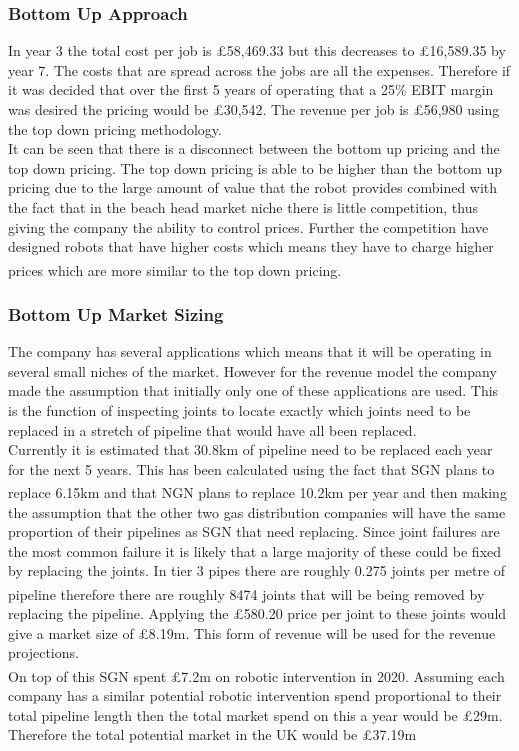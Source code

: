 \documentclass[11pt]{article}		%
\newcommand{\supercite}[1]{\textsuperscript{\cite{#1}}}		%
\begin{document}
            \subsubsection{Bottom Up Approach}

	            In year 3 the total cost per job is £58,469.33 but this decreases to £16,589.35 by year 7. The costs that are spread across the jobs are all the expenses. Therefore if it was decided that over the first 5 years of operating that a 25\% EBIT margin was desired the pricing would be £30,542. The revenue per job is £56,980 using the top down pricing methodology.
	            \\
	            It can be seen that there is a disconnect between the bottom up pricing and the top down pricing. The top down pricing is able to be higher than the bottom up pricing due to the large amount of value that the robot provides combined with the fact that in the beach head market niche there is little competition, thus giving the company the ability to control prices. Further the competition have designed robots that have higher costs which means they have to charge higher prices which are more similar to the top down pricing.\supercite{Barney}
            
            \subsubsection{Bottom Up Market Sizing}

	            The company has several applications which means that it will be operating in several small niches of the market. However for the revenue model the company made the assumption that initially only one of these applications are used. This is the function of inspecting joints to locate exactly which joints need to be replaced in a stretch of pipeline that would have all been replaced. 
		 \\
		        Currently it is estimated that 30.8km of pipeline need to be replaced each year for the next 5 years. This has been calculated using the fact that SGN plans to replace 6.15km \supercite{SGN_Southern}\supercite{SGN_Scotland} and that NGN plans to replace 10.2km per year\supercite{NGN_decisions} and then making the assumption that the other two gas distribution companies will have the same proportion of their pipelines as SGN that need replacing. Since joint failures are the most common failure it is likely that a large majority of these could be fixed by replacing the joints. In tier 3 pipes there are roughly 0.275 joints per metre of pipeline \supercite{SGN_Southern} therefore there are roughly 8474 joints that will be being removed by replacing the pipeline. Applying the £580.20 price per joint to these joints would give a market size of £8.19m. This form of revenue will be used for the revenue projections.
		        \\
		        On top of this SGN spent £7.2m on robotic intervention in 2020.\supercite{SGN_Scotland}\supercite{SGN_Southern} Assuming each company has a similar potential robotic intervention spend proportional to their total pipeline length then the total market spend on this a year would be £29m. Therefore the total potential market in the UK would be £37.19m
		        
\end{document}
